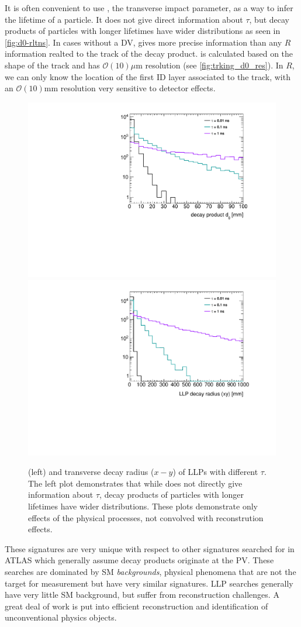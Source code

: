 It is often convenient to use \dzero, the transverse impact parameter, as a way to infer the lifetime of a particle. It does not give direct information about $\tau$, but decay products of particles with longer lifetimes have wider \dzero distributions as seen in \autoref{fig:d0-rltns}. In cases without a \ac{DV}, \dzero gives more precise information than any $R$ information realted to the track of the decay product. \dzero is calculated based on the shape of the track and has $\mathcal{O}(10)\mu \textrm{m}$ resolution (see \autoref{fig:trking_d0_res}). In $R$, we can only know the location of the first \ac{ID} layer associated to the track, with an $\mathcal{O}(10)\textrm{mm}$ resolution very sensitive to detector effects.


\begin{figure}[htbp]
\centering
\includegraphics[width=.48\textwidth]{figures/theory/signal_d0.pdf}
\includegraphics[width=.48\textwidth]{figures/theory/signal_rxy.pdf}
\caption{\dzero (left) and transverse decay radius ($x-y$) of \ac{LLP}s with different $\tau$. The left plot demonstrates that while \dzero does not directly give information about $\tau$, decay products of particles with longer lifetimes have wider \dzero distributions. These plots demonstrate only effects of the physical processes, not convolved with reconstrution effects.}
\label{fig:d0-rltns}
\end{figure}


These signatures are very unique with respect to other signatures searched for in \ac{ATLAS} which generally assume decay products originate at the \ac{PV}. These searches are dominated by \ac{SM} \emph{backgrounds}, physical phenomena that are not the target for measurement but have very similar signatures. \ac{LLP} searches generally have very little \ac{SM} background, but suffer from reconstruction challenges. A great deal of work is put into efficient reconstruction and identification of unconventional physics objects.

